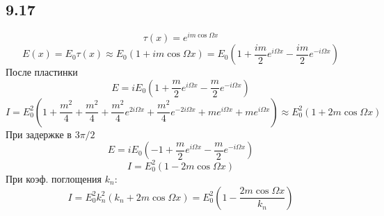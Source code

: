 \subsection*{9.17}
$$\tau (x) = e^{im\cos\Omega x}$$
$$E(x) = E_0 \tau (x) \approx E_0 (1 + im \cos \Omega x) = E_0(1+\frac{im}{2} e^{i\Omega x} -\frac{im}{2} e^{-i\Omega x}  )$$
После пластинки
$$E = iE_0(1+\frac{m}{2} e^{i\Omega x} -\frac{m}{2} e^{-i\Omega x})$$
$$I = E^2_0(1+\frac{m^2}{4} + \frac{m^2}{4} + \frac{m^2}{4} e^{2i\Omega x} + \frac{m^2}{4} e^{-2i\Omega x} + m e^{i\Omega x} + m e^{i\Omega x}) \approx E^2_0 (1 + 2m \cos \Omega x)$$
При задержке в $3 \pi /2$
$$E = iE_0(-1+\frac{m}{2} e^{i\Omega x} -\frac{m}{2} e^{-i\Omega x})$$
$$I =  E^2_0 (1 - 2m \cos \Omega x)$$
При коэф. поглощения $k_n$:
$$I = E^2_0 k_n^2 (k_n + 2m \cos \Omega x) = E_0^2 ( 1 - \frac{2 m \cos \Omega x}{k_n})$$